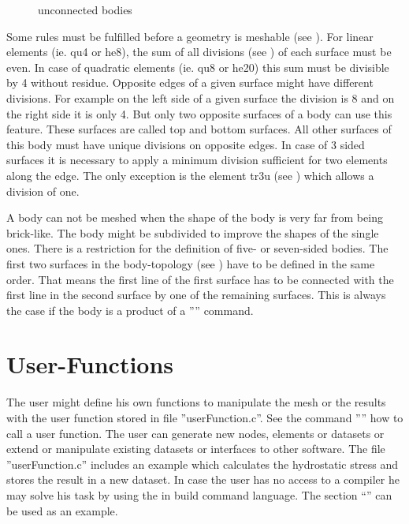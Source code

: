 \documentclass{article}
\begin{document}
\begin{figure}[h]
\caption{\label{unconnectedBodies} unconnected bodies}
\end{figure}
 
Some rules must be fulfilled before a geometry is meshable (see ). For linear elements (ie. qu4 or he8), the sum of all divisions (see ) of each surface must be even. In case of quadratic elements (ie. qu8 or he20) this sum must be divisible by 4 without residue. Opposite edges of a given surface might have different divisions. For example on the left side of a given surface the division is 8 and on the right side it is only 4. But only two opposite surfaces of a body can use this feature. These surfaces are called top and bottom surfaces. All other surfaces of this body must have unique divisions on opposite edges. In case of 3 sided surfaces it is necessary to apply a minimum division sufficient for two elements along the edge. The only exception is the element tr3u (see ) which allows a division of one.

A body can not be meshed when the shape of the body is very far from being brick-like. The body might be subdivided to improve the shapes of the single ones. There is a restriction for the definition of five- or seven-sided bodies. The first two surfaces in the body-topology (see ) have to be defined in the same order. That means the first line of the first surface has to be connected with the first line in the second surface by one of the remaining surfaces. This is always the case if the body is a product of a '''' command.

 \section{\label{User-Functions}User-Functions}
The user might define his own functions to manipulate the mesh or the results with the user function stored in file ''userFunction.c''. See the command '''' how to call a user function. The user can generate new nodes, elements or datasets or extend or manipulate existing datasets or interfaces to other software. The file ''userFunction.c'' includes an example which calculates the hydrostatic stress and stores the result in a new dataset. In case the user has no access to a compiler he may solve his task by using the in build command language. The section ``'' can be used as an example.
\end{document}
